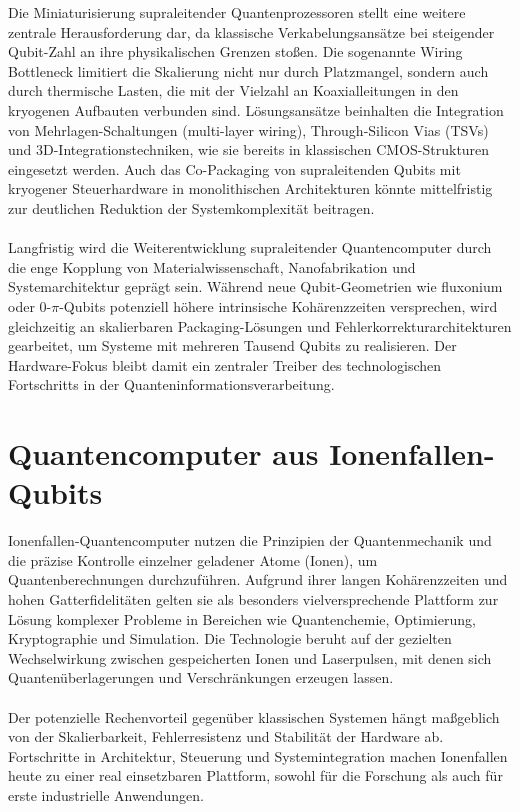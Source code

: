 Die Miniaturisierung supraleitender Quantenprozessoren stellt eine weitere zentrale Herausforderung dar, da klassische Verkabelungsansätze bei steigender Qubit-Zahl an ihre physikalischen Grenzen stoßen. Die sogenannte \grqq Wiring Bottleneck\grqq{} limitiert die Skalierung nicht nur durch Platzmangel, sondern auch durch thermische Lasten, die mit der Vielzahl an Koaxialleitungen in den kryogenen Aufbauten verbunden sind. Lösungsansätze beinhalten die Integration von Mehrlagen-Schaltungen (multi-layer wiring), Through-Silicon Vias (TSVs) und 3D-Integrationstechniken, wie sie bereits in klassischen CMOS-Strukturen eingesetzt werden. Auch das Co-Packaging von supraleitenden Qubits mit kryogener Steuerhardware in monolithischen Architekturen könnte mittelfristig zur deutlichen Reduktion der Systemkomplexität beitragen.\\\\
Langfristig wird die Weiterentwicklung supraleitender Quantencomputer durch die enge Kopplung von Materialwissenschaft, Nanofabrikation und Systemarchitektur geprägt sein. Während neue Qubit-Geometrien wie fluxonium oder 0-$\pi$-Qubits potenziell höhere intrinsische Kohärenzzeiten versprechen, wird gleichzeitig an skalierbaren Packaging-Lösungen und Fehlerkorrekturarchitekturen gearbeitet, um Systeme mit mehreren Tausend Qubits zu realisieren. Der Hardware-Fokus bleibt damit ein zentraler Treiber des technologischen Fortschritts in der Quanteninformationsverarbeitung.
\section{Quantencomputer aus Ionenfallen-Qubits}
Ionenfallen-Quantencomputer nutzen die Prinzipien der Quantenmechanik und die präzise Kontrolle einzelner geladener Atome (Ionen), um Quantenberechnungen durchzuführen. Aufgrund ihrer langen Kohärenzzeiten und hohen Gatterfidelitäten gelten sie als besonders vielversprechende Plattform zur Lösung komplexer Probleme in Bereichen wie Quantenchemie, Optimierung, Kryptographie und Simulation. Die Technologie beruht auf der gezielten Wechselwirkung zwischen gespeicherten Ionen und Laserpulsen, mit denen sich Quantenüberlagerungen und Verschränkungen erzeugen lassen.
\\\\
Der potenzielle Rechenvorteil gegenüber klassischen Systemen hängt maßgeblich von der Skalierbarkeit, Fehlerresistenz und Stabilität der Hardware ab. Fortschritte in Architektur, Steuerung und Systemintegration machen Ionenfallen heute zu einer real einsetzbaren Plattform, sowohl für die Forschung als auch für erste industrielle Anwendungen.

